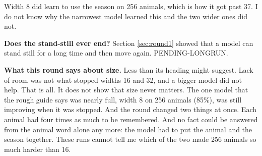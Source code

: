 Width 8 did learn to use the season on 256 animals, which is how it got past 37. I do not know
why the narrowest model learned this and the two wider ones did not.

\textbf{Does the stand-still ever end?} Section \ref{sec:round1} showed that a model can stand
still for a long time and then move again. PENDING-LONGRUN.

\textbf{What this round says about size.} Less than its heading might suggest. Lack of room
was not what stopped widths 16 and 32, and a bigger model did not help. That is all. It does
not show that size never matters. The one model that the rough guide says was nearly full,
width 8 on 256 animals (85\%), was still improving when it was stopped. And the round changed
two things at once. Each animal had four times as much to be remembered. And no fact could be
answered from the animal word alone any more: the model had to put the animal and the season
together. These runs cannot tell me which of the two made 256 animals so much harder than 16.
